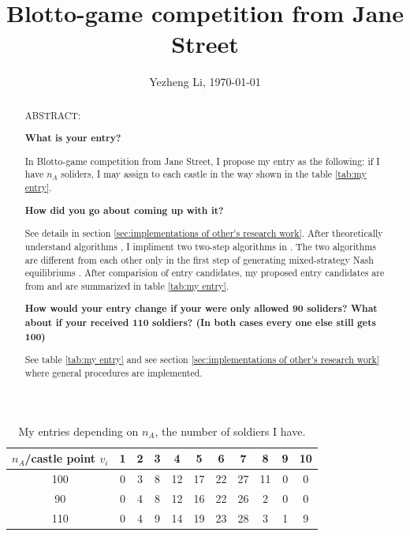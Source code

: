 \documentclass[aos,preprint]{imsart}  %
\numberwithin{table}{section} %
\theoremstyle{plain}
\theoremstyle{plain}
\theoremstyle{TheoremNum}
\newcommand{\1}{{\bf 1}}
\newcommand{\0}{{\vec{\mathbf{0}}}}
\numberwithin{equation}{section}
\begin{document}
\title{Blotto-game competition from Jane Street}

\author{Yezheng Li, \today}	


\begin{abstract}ABSTRACT:
	
\textbf{What is your entry?}
	
	In Blotto-game competition from Jane Street, I propose my entry as the following: if I have $n_A$ soliders, I may assign to each castle in the way shown in the table \ref{tab:my entry}.
	
\textbf{How did you go about coming up with it?}

See details in section \ref{sec:implementations of other's research work}. After theoretically understand algorithms \citep{ahmadinejad2016duels,behnezhad2017faster,vu2018efficient}, I impliment two two-step algorithms in \citep{behnezhad2017faster,vu2018efficient}. The two algorithms are different from each other only in the first step of  generating mixed-strategy Nash equilibriums \citep{li2018blotto}. After comparision of entry candidates, my proposed entry candidates are from  \citep{behnezhad2017faster} and are summarized in table \ref{tab:my entry}. 

\textbf{How would your entry change if your were only allowed 90 soliders? What about if your received 110 soldiers? (In both cases every one else still gets 100)}

See table \ref{tab:my entry} and see section \ref{sec:implementations of other's research work} where general procedures are implemented.
\end{abstract}
\tableofcontents
\maketitle
	\begin{table}[htbp] \caption{My entries depending on $n_A$, the number of soldiers I have.}
	\label{tab:my entry}
	\begin{center}
		\begin{tabular}{|c|c|c|c|c|c|c|c|c|c|c|} \hline  
			$n_A$/castle point $v_i$ & 1 & 2 & 3 & 4 & 5 & 6 & 7 & 8 & 9 & 10 \\\hline
			100 & 0 & 3 & 8 & 12 & 17 & 22 & 27 & 11 & 0 & 0 \\
			90 & 0 & 4 & 8 & 12 & 16 & 22 & 26 &2  &  0 & 0 \\
			110 & 0 & 4 & 9 & 14 & 19 & 23 & 28 & 3 & 1 & 9 
			\\ \hline				
		\end{tabular}
	\end{center}
	
\end{table}
\end{document}
